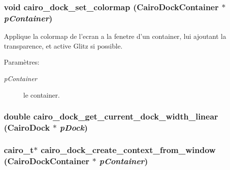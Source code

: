 \subsubsection{\setlength{\rightskip}{0pt plus 5cm}void cairo\_\-dock\_\-set\_\-colormap ({\bf CairoDockContainer} $\ast$ {\em pContainer})}\label{cairo-dock-draw_8h_7a1ebe89632afd310eacdb3f2eca327b}


Applique la colormap de l'ecran a la fenetre d'un container, lui ajoutant la transparence, et active Glitz si possible. \begin{Desc}
\item[Paramètres:]
\begin{description}
\item[{\em pContainer}]le container. \end{description}
\end{Desc}
\subsubsection{\setlength{\rightskip}{0pt plus 5cm}double cairo\_\-dock\_\-get\_\-current\_\-dock\_\-width\_\-linear ({\bf CairoDock} $\ast$ {\em pDock})}\label{cairo-dock-draw_8h_ea372b03ccfb1e8a769c817f9b750f37}


\subsubsection{\setlength{\rightskip}{0pt plus 5cm}cairo\_\-t$\ast$ cairo\_\-dock\_\-create\_\-context\_\-from\_\-window ({\bf CairoDockContainer} $\ast$ {\em pContainer})}\label{cairo-dock-draw_8h_c7e4921965f7094bc408f4780f984250}


